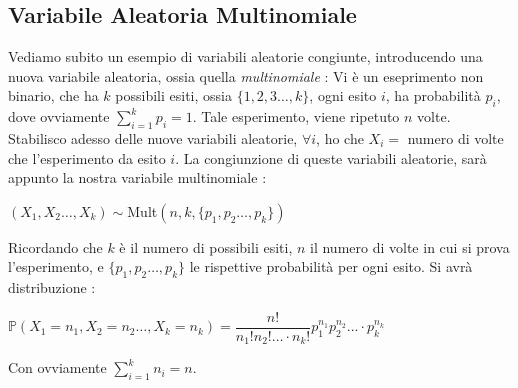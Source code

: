 \documentclass[12pt, letterpaper]{article}
\newcommand{\Prob}{{\mathbb P}}
\begin{document}
\subsection{Variabile Aleatoria Multinomiale}
Vediamo subito un esempio di variabili aleatorie congiunte, introducendo una nuova variabile 
aleatoria, ossia quella \textit{multinomiale} : Vi è un eseprimento non binario, che 
ha \(k\) possibili esiti, ossia \(\{1,2,3\dots,k\}\), ogni esito \(i\), ha probabilità \(p_i\), dove 
ovviamente \(\displaystyle\sum_{i=1}^kp_i=1\). Tale esperimento, viene ripetuto \(n\) volte. Stabilisco 
adesso delle nuove variabili aleatorie, \(\forall i\), ho che \(X_i=\) numero di volte che l'esperimento 
da esito \(i\). La congiunzione di queste variabili aleatorie, sarà appunto la nostra variabile multinomiale : \begin{center}
    \((X_1,X_2\dots,X_k)\sim\)Mult\((n,k,\{p_1,p_2\dots,p_k\})\)
\end{center} 
Ricordando che \(k\) è il numero di possibili esiti, \(n\) il numero di volte in cui si prova l'esperimento, e 
\(\{p_1,p_2\dots,p_k\}\) le rispettive probabilità per ogni esito. Si avrà distribuzione : \begin{center}
    \(\Prob(X_1=n_1,X_2=n_2\dots,X_k=n_k)=\dfrac{n!}{n_1!n_2!\dots\cdot n_k!} p_1^{n_1} p_2^{n_2}...\cdot p_k^{n_k}\)
\end{center}
Con ovviamente \(\displaystyle \sum_{i=1}^kn_i=n\).
\end{document}
